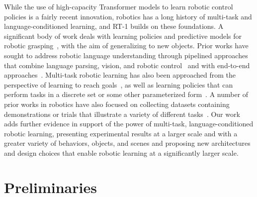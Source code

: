 \documentclass{article} %
\begin{document}
While the use of high-capacity Transformer models to learn robotic control policies is a fairly recent innovation, robotics has a long history of multi-task and language-conditioned learning, and RT-1 builds on these foundations. 
A significant body of work deals with learning policies and predictive models for robotic grasping~\citep{saxena2006robotic,lenz2015deep,pinto2016supersizing,gupta2018robot,viereck2017learning}, with the aim of generalizing to new objects. 
Prior works have sought to address robotic language understanding through pipelined approaches that combine language parsing, vision, and robotic control~\citep{macmahon2006walk,kollar2010toward,tellex2011understanding} and with end-to-end approaches~\citep{mei2016listen,stepputtis2020language,lynch2020language,ahn2022can}. 
Multi-task robotic learning has also been approached from the perspective of learning to reach goals~\citep{chung2015bayesian,raffin2019decoupling,jurgenson2020sub,huang2020motion}, as well as learning policies that can perform tasks in a discrete set or some other parameterized form~\citep{deisenroth2014multi,devin2017learning,fox2019multi,kalashnikov2021mt}. 
A number of prior works in robotics have also focused on collecting datasets containing demonstrations or trials that illustrate a variety of different tasks~\citep{sharma2018multiple,dasari2019robonet,yu2020meta,singh2020scalable,james2020rlbench}.
Our work adds further evidence in support of the power of multi-task, language-conditioned robotic learning, presenting experimental results at a larger scale and with a greater variety of behaviors, objects, and scenes and proposing new architectures and design choices that enable robotic learning at a significantly larger scale.



\section{Preliminaries}\label{sec:prelims}
\end{document}
